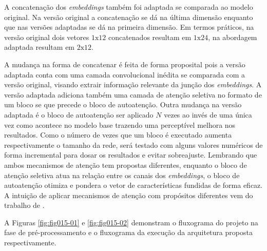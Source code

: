 A concatenação dos \textit{embeddings} também foi adaptada se comparada ao modelo original. Na versão original a concatenação se dá na última dimensão enquanto que nas versões adaptadas se dá na primeira dimensão. Em termos práticos, na versão original dois vetores $1\text{x}12$ concatenados resultam em $1\text{x}24$, na abordagem adaptada resultam em $2\text{x}12$. 

A mudança na forma de concatenar é feita de forma proposital pois a versão adaptada conta com uma camada convolucional inédita se comparada com a versão original, visando extrair informação relevante da junção dos \textit{embeddings}. A versão adaptada adiciona também uma camada de atenção seletiva no formato de um bloco \gls{se} que precede o bloco de autoatenção. Outra mudança na versão adaptada é o bloco de autoatenção ser aplicado $N$ vezes ao invés de uma única vez como acontece no modelo base trazendo uma perceptível melhora nos resultados. Como o número de vezes que um bloco é executado aumenta respectivamente o tamanho da rede, será testado com alguns valores numéricos de forma incremental para dosar os resultados e evitar sobreajuste. Lembrando que ambos mecanismos de atenção tem propostas diferentes, enquanto o bloco de atenção seletiva atua na relação entre os canais dos \textit{embeddings}, o bloco de autoatenção otimiza e pondera o vetor de características fundidas de forma eficaz. A intuição de aplicar mecanismos de atenção com propósitos diferentes vem do trabalho de . 

A Figuras \ref{fig:fig015-01} e \ref{fig:fig015-02} demonstram o fluxograma do projeto na fase de pré-processamento e o fluxograma da execução da arquitetura proposta respectivamente.

